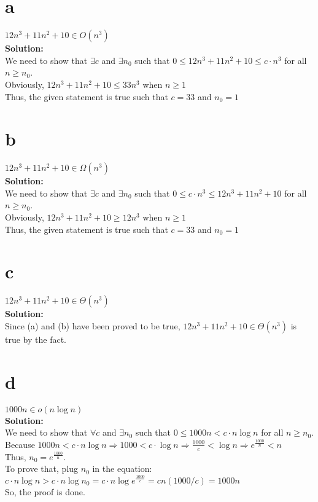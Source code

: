 \documentclass[12pt]{article}
\begin{document}
\begin{minipage}[t]{24cm}
\begin{itemize}
\part{a} $12 n^3 +11n^2+10 \in O(n^3)$
\\\textbf{Solution: } 
\\We need to show that $\exists c$ and $\exists {n_0}$ such that $0 \leq 12 n^3 +11n^2+10 \leq c \cdot n^3$ for all $n \geq {n_0}$.
\\Obviously, $12 n^3 + 11 n^2 + 10 \leq 33 n ^3$ when $n \geq 1$
\\Thus, the given statement is true such that $c = 33$ and $n_0 = 1$
\part{b} $12 n^3 +11n^2+10 \in \Omega(n^3)$
\\\textbf{Solution: }
\\We need to show that $\exists c$ and $\exists {n_0}$ such that $0 \leq c\cdot n^3 \leq 12 n^3 + 11n^2 + 10$ for all $n \geq {n_0}$.
\\Obviously, $12 n^3 + 11 n^2 + 10 \geq 12 n ^3$ when $n \geq 1$
\\Thus, the given statement is true such that $c = 33$ and $n_0 = 1$
\part{c} $12 n^3 +11n^2+10 \in \Theta(n^3)$
\\\textbf{Solution: }
\\Since (a) and (b) have been proved to be true, $12 n^3 + 11n ^2 + 10 \in \Theta(n^3)$ is true by the fact.
\part{d} $1000n \in o(n \log n)$
\\\textbf{Solution: }
\\We need to show that $\forall c$ and $\exists {n_0}$ such that $0 \leq 1000n < c \cdot n \log n$ for all $n \geq {n_0}$.
\\Because $1000n < c \cdot n \log n \Rightarrow 1000 < c \cdot \log n \Rightarrow \frac{1000} {c} < \log n \Rightarrow e^\frac {1000} {n} < n$
\\Thus, $n_0 = e^\frac{1000} {n}$.
\\To prove that, plug $n_0$ in the equation:
\\$c \cdot n \log n > c \cdot n \log n_0 = c \cdot n \log e^\frac{1000} {c} = cn(1000/c) = 1000n$
\\So, the proof is done.

\end{itemize}
\end{minipage}
\end{document}
